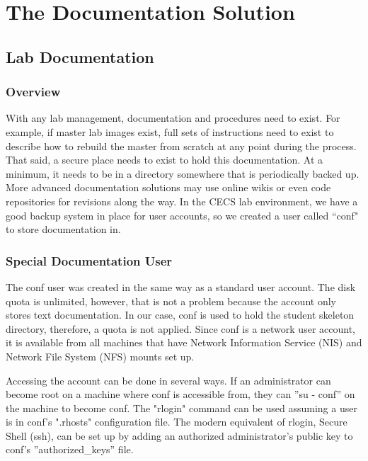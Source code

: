 \chapter{The Documentation Solution} \label{ch:documentation_solution}
\section{Lab Documentation}\label{sec:documentation_solution}
\subsection{Overview}
With any lab management, documentation and procedures need to exist.  For example, if master lab images exist, full sets of instructions need to exist to describe how to rebuild the master from scratch at any point during the process.  That said, a secure place needs to exist to hold this documentation.  At a minimum, it needs to be in a directory somewhere that is periodically backed up.  More advanced documentation solutions may use online wikis or even code repositories for revisions along the way.  In the CECS lab environment, we have a good backup system in place for user accounts, so we created a user called ``conf" to store documentation in.  

\subsection{Special Documentation User}
The conf user was created in the same way as a standard user account.  The disk quota is unlimited, however, that is not a problem because the account only stores text documentation.  In our case, conf is used to hold the student skeleton directory, therefore, a quota is not applied.  Since conf is a network user account, it is available from all machines that have Network Information Service (NIS) and Network File System (NFS) mounts set up.  

Accessing the account can be done in several ways.  If an administrator can become root on a machine where conf is accessible from, they can ”su - conf” on the machine to become conf.  The "rlogin" command can be used assuming a user is in conf’s ".rhosts" configuration file.  The modern equivalent of rlogin, Secure Shell (ssh), can be set up by adding an authorized administrator’s public key to conf’s ”authorized\_keys” file.  

